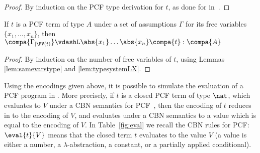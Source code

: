 \documentclass{article}
\begin{document}
\begin{proof}
By induction on the PCF type derivation for $t$, as done for \ST in~\cite{AlvesS:TCS}.


\end{proof}
\begin{theorem}If $t$ is a PCF term of type $A$ under a set of
assumptions $\Gamma$ for its free variables $\{x_1,\dots,x_n\}$, then
$\compa{\Gamma_{|\FV(t)}} \vdashL \abs{x_1}\ldots
\abs{x_n}\compa{t}:\compa{A}$
\end{theorem}
\begin{proof}
By induction on the number of free variables of $t$, using Lemmas~
\ref{lem:samevarstype} and \ref{lem:typesystemLX}.
\end{proof}

Using the encodings given above, it is possible to simulate the
evaluation of a PCF program in \LLCIrec.
More precisely, if $t$ is a
closed PCF term of type $\nat$, which evaluates to $V$ under a CBN
semantics for PCF~\cite{Plotkin77}, then the encoding of $t$ reduces
in \LLCIrec to the encoding of $V$, and evaluates under a CBN semantics
to a value which is equal to the encoding of $V$.
In Table~\ref{fig:eval} we recall the CBN rules for PCF: $\eval{t}{V}$
means that the closed term $t$ evaluates to the value $V$ (a value is
either a number, a $\lambda$-abstraction, a constant, or a partially
applied conditional).
\end{document}
